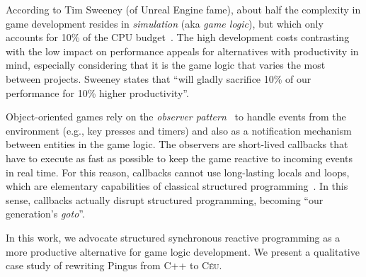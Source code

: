 \documentclass[times,twocolumn,final]{elsarticle}
\newcommand{\CEU}{\textsc{C\'{e}u}\xspace}
\begin{document}
According to Tim Sweeney (of Unreal Engine fame), about half the complexity in
game development resides in \emph{simulation} (aka \emph{game logic}), but
which only accounts for 10\% of the CPU budget~\cite{games.sweeney}.
The high development costs contrasting with the low impact on performance
appeals for alternatives with productivity in mind, especially considering that
it is the game logic that varies the most between projects.
Sweeney states that ``will gladly sacrifice 10\% of our performance for 10\%
higher productivity''.


Object-oriented games rely on the \emph{observer pattern}~\cite{games.patterns}
to handle events from the environment (e.g., key presses and timers) and also
as a notification mechanism between entities in the game logic.
%
The observers are short-lived callbacks that have to execute as fast as
possible to keep the game reactive to incoming events in real time.
%
For this reason, callbacks cannot use long-lasting locals and loops, which are
elementary capabilities of classical structured
programming~\cite{rp.deprecating,rp.rescala,sync_async.cooperative}.
%
In this sense, callbacks actually disrupt structured programming, becoming
``our generation's \emph{goto}''.%

In this work, we advocate structured synchronous reactive programming as a more
productive alternative for game logic development.
We present a qualitative case study of rewriting Pingus from C++ to \CEU.
\end{document}

